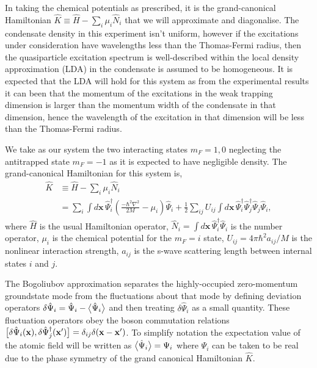 In taking the chemical potentials as prescribed, it is the grand-canonical Hamiltonian $\hat{K} \equiv \hat{H} - \sum_i \mu_i \hat{N}_i$ that we will approximate and diagonalise.  The condensate density in this experiment isn't uniform, however if the excitations under consideration have wavelengths less than the Thomas-Fermi radius, then the quasiparticle excitation spectrum is well-described within the local density approximation (LDA) \citep{Stamper-Kurn:1999,Zambelli:2000} in the condensate is assumed to be homogeneous.  It is expected that the LDA will hold for this system as from the experimental results it can been that the momentum of the excitations in the weak trapping dimension is larger than the momentum width of the condensate in that dimension, hence the wavelength of the excitation in that dimension will be less than the Thomas-Fermi radius.


We take as our system the two interacting states $m_F=1, 0$ neglecting the antitrapped state $m_F=-1$ as it is expected to have negligible density. The grand-canonical Hamiltonian for this system is,
\begin{align}
    \hat{K} &\equiv \hat{H} - \sum_i \mu_i \hat{N}_i\\
            &= \sum_i \int d\mathbf{x}\, \hat{\Psi}_i^\dagger \left(\frac{-\hbar^2 \nabla^2}{2 M} - \mu_i\right)\hat{\Psi}_i + \frac{1}{2} \sum_{i j} U_{i j}\int d\mathbf{x}\, \hat{\Psi}_i^\dagger \hat{\Psi}_j^\dagger \hat{\Psi}_j \hat{\Psi}_i,
\end{align}
where $\hat{H}$ is the usual Hamiltonian operator, $\hat{N}_i= \int d\mathbf{x}\, \hat{\Psi}_i^\dagger \hat{\Psi}_i$ is the number operator, $\mu_i$ is the chemical potential for the $m_F=i$ state, $U_{ij} = 4\pi \hbar^2 a_{ij}/M$ is the nonlinear interaction strength, $a_{ij}$ is the s-wave scattering length between internal states $i$ and $j$.

The Bogoliubov approximation separates the highly-occupied zero-momentum groundstate mode from the fluctuations about that mode by defining deviation operators $\delta\hat{\Psi}_i = \hat{\Psi}_i - \big<\hat{\Psi}_i\big>$ and then treating $\delta\hat{\Psi}_i$ as a small quantity. These fluctuation operators obey the boson commutation relations $\big[\delta\hat{\Psi}_i(\mathbf{x}), \delta \hat{\Psi}_j^\dagger(\mathbf{x}')\big] = \delta_{i j} \delta(\mathbf{x}-\mathbf{x}')$. To simplify notation the expectation value of the atomic field will be written as $\big<\hat{\Psi}_i\big> = \Psi_i$ where $\Psi_i$ can be taken to be real due to the phase symmetry of the grand canonical Hamiltonian $\hat{K}$.

